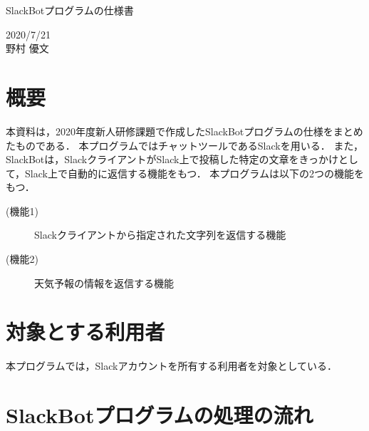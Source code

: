 \documentclass[12pt]{jsarticle}
\begin{document}
\begin{center}
{\LARGE SlackBotプログラムの仕様書}
\end{center}

\begin{flushright}
  2020/7/21\\
  野村 優文
\end{flushright}

\section{概要}\label{sec:overview}
\label{sec:introduction}
本資料は，2020年度新人研修課題で作成したSlackBotプログラムの仕様をまとめたものである．
本プログラムではチャットツールであるSlack\cite{Slack}を用いる．
また，SlackBotは，SlackクライアントがSlack上で投稿した特定の文章をきっかけとして，Slack上で自動的に返信する機能をもつ．
本プログラムは以下の2つの機能をもつ．

\begin{description}
\item[(機能1)] Slackクライアントから指定された文字列を返信する機能
  
\item[(機能2)]\label{enum:function2} %
  天気予報の情報を返信する機能
\end{description}

\section{対象とする利用者}
本プログラムでは，Slackアカウントを所有する利用者を対象としている．


\section{SlackBotプログラムの処理の流れ}
\label{sec:flow}
\end{document}
